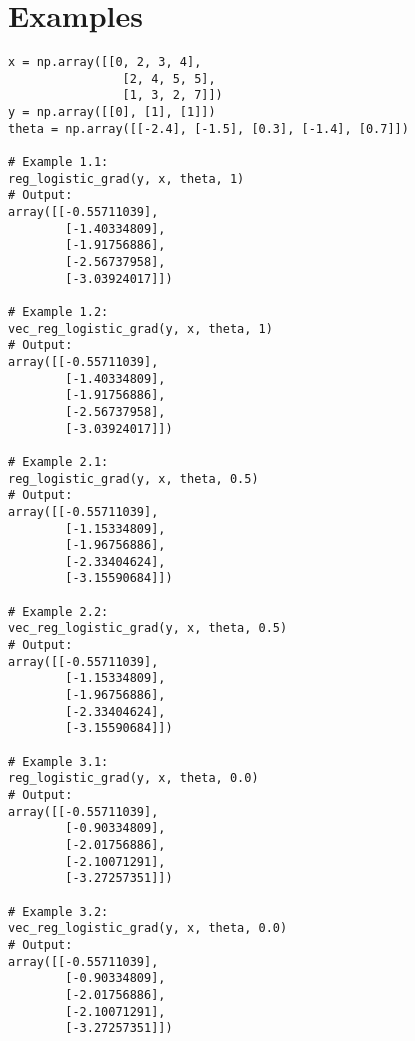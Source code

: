 \section*{Examples}
\begin{verbatim}
x = np.array([[0, 2, 3, 4], 
				[2, 4, 5, 5], 
				[1, 3, 2, 7]])
y = np.array([[0], [1], [1]])
theta = np.array([[-2.4], [-1.5], [0.3], [-1.4], [0.7]])

# Example 1.1:
reg_logistic_grad(y, x, theta, 1)
# Output:
array([[-0.55711039],
		[-1.40334809],
		[-1.91756886],
		[-2.56737958],
		[-3.03924017]])

# Example 1.2:
vec_reg_logistic_grad(y, x, theta, 1)
# Output:
array([[-0.55711039],
		[-1.40334809],
		[-1.91756886],
		[-2.56737958],
		[-3.03924017]])

# Example 2.1:
reg_logistic_grad(y, x, theta, 0.5)
# Output:
array([[-0.55711039],
		[-1.15334809],
		[-1.96756886],
		[-2.33404624],
		[-3.15590684]])

# Example 2.2:
vec_reg_logistic_grad(y, x, theta, 0.5)
# Output:
array([[-0.55711039],
		[-1.15334809],
		[-1.96756886],
		[-2.33404624],
		[-3.15590684]])

# Example 3.1:
reg_logistic_grad(y, x, theta, 0.0)
# Output:
array([[-0.55711039],
		[-0.90334809],
		[-2.01756886],
		[-2.10071291],
		[-3.27257351]])

# Example 3.2:
vec_reg_logistic_grad(y, x, theta, 0.0)
# Output:
array([[-0.55711039],
		[-0.90334809],
		[-2.01756886],
		[-2.10071291],
		[-3.27257351]])
\end{verbatim}
